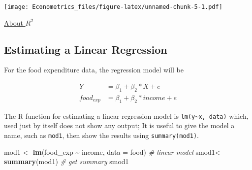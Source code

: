 \documentclass[
]{book}
\newenvironment{Shaded}{\begin{snugshade}}{\end{snugshade}}
\newcommand{\AttributeTok}[1]{\textcolor[rgb]{0.13,0.29,0.53}{#1}}
\newcommand{\CommentTok}[1]{\textcolor[rgb]{0.56,0.35,0.01}{\textit{#1}}}
\newcommand{\DecValTok}[1]{\textcolor[rgb]{0.00,0.00,0.81}{#1}}
\newcommand{\FunctionTok}[1]{\textcolor[rgb]{0.13,0.29,0.53}{\textbf{#1}}}
\newcommand{\NormalTok}[1]{#1}
\newcommand{\OtherTok}[1]{\textcolor[rgb]{0.56,0.35,0.01}{#1}}
\newcommand{\SpecialCharTok}[1]{\textcolor[rgb]{0.81,0.36,0.00}{\textbf{#1}}}
\newcommand{\StringTok}[1]{\textcolor[rgb]{0.31,0.60,0.02}{#1}}
\begin{document}
\begin{Shaded}
\end{Shaded}

\texttt{[image: Econometrics\_files/figure-latex/unnamed-chunk-5-1.pdf]}

\href{https://www.investopedia.com/terms/r/r-squared.asp}{About \(R^2\)}

\hypertarget{estimating-a-linear-regression}{%
\subsection{Estimating a Linear Regression}\label{estimating-a-linear-regression}}

For the food expenditure data, the regression model will be

\[
\begin{aligned}
Y&=\beta_1+\beta_2 *X+e \\
food_{exp}&=\beta_1+\beta_2*income+e
\end{aligned}
\]

The R function for estimating a linear regression model is \texttt{lm(y\textasciitilde{}x,\ data)} which, used just by itself does not show any output; It is useful to give the model a name, such as \texttt{mod1}, then show the results using \texttt{summary(mod1)}.

\begin{Shaded}
\begin{Highlighting}[]
\NormalTok{mod1 }\OtherTok{\textless{}{-}} \FunctionTok{lm}\NormalTok{(food\_exp }\SpecialCharTok{\textasciitilde{}}\NormalTok{ income, }\AttributeTok{data =}\NormalTok{ food)           }\CommentTok{\# linear model}
\NormalTok{smod1}\OtherTok{\textless{}{-}} \FunctionTok{summary}\NormalTok{(mod1)                                }\CommentTok{\# get summary }
\NormalTok{smod1}
\end{Highlighting}
\end{Shaded}
\end{document}
